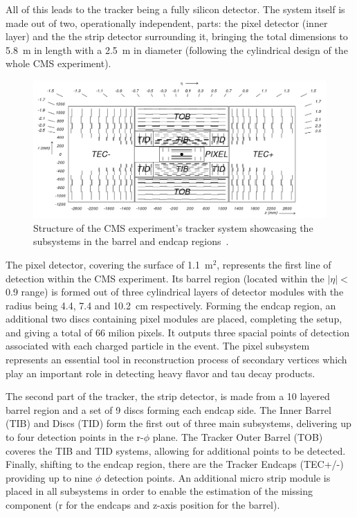 \hspace{10pt} All of this leads to the tracker being a fully silicon detector. The system itself is made out of two, operationally independent, parts: the pixel detector (inner layer) and the the strip detector surrounding it, bringing the total dimensions to 5.8~m in length with a 2.5~m in diameter (following the cylindrical design of the whole CMS experiment).
\hspace{10pt} 
\begin{figure}[htbp]
  \centering
    \includegraphics[width=\textwidth]{CMS_experiment/cmstracker.png}
  \caption[Structure of the CMS experiment's tracker system showcasing the subsystems in the barrel and endcap regions.]{Structure of the CMS experiment's tracker system showcasing the subsystems in the barrel and endcap regions~\cite{Tracker:scheme}.}
  \label{fig:tracker}
\end{figure}

\hspace{10pt} The pixel detector, covering the surface of 1.1~m$^{\text{2}}$, represents the first line of detection within the CMS experiment. Its barrel region (located within the $|\eta|<$0.9 range) is formed out of three cylindrical layers of detector modules with the radius being 4.4, 7.4 and 10.2~cm respectively. Forming the endcap region, an additional two discs containing pixel modules are placed, completing the setup, and giving a total of 66 milion pixels. It outputs three spacial points of detection associated with each charged particle in the event. The pixel subsystem represents an essential tool in reconstruction process of secondary vertices which play an important role in detecting heavy flavor and tau decay products. 

\hspace{10pt} The second part of the tracker, the strip detector, is made from a 10 layered barrel region and a set of 9 discs forming each endcap side. The Inner Barrel (TIB) and Discs (TID) form the first out of three main subsystems, delivering up to four detection points in the r-$\phi$ plane. The Tracker Outer Barrel (TOB) coveres the TIB and TID systems, allowing for additional points to be detected. Finally, shifting to the endcap region, there are the Tracker Endcaps (TEC+/-) providing up to nine $\phi$ detection points. An additional micro strip module is placed in all subsystems in order to enable the estimation of the missing component (r for the endcaps and z-axis position for the barrel).

